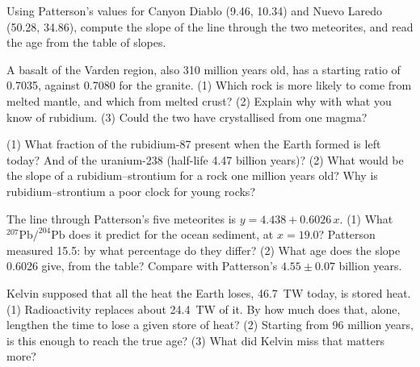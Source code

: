\begin{exercise}[$\star\star$]\label{exo:g12:age-of-the-earth:11}
Using Patterson's values for Canyon Diablo (9.46, 10.34) and Nuevo Laredo
(50.28, 34.86), compute the slope of the line through the two meteorites,
and read the age from the table of slopes.
\end{exercise}

\begin{exercise}[$\star\star\star$]\label{exo:g12:age-of-the-earth:12}
A basalt of the Varden region, also 310 million years old, has a starting
ratio of 0.7035, against 0.7080 for the granite. (1) Which rock is more
likely to come from melted mantle, and which from melted crust? (2) Explain
why with what you know of rubidium. (3) Could the two have crystallised from
one magma?
\end{exercise}

\begin{exercise}[$\star\star\star$]\label{exo:g12:age-of-the-earth:13}
(1) What fraction of the rubidium-87 present when the Earth formed is left
today? And of the uranium-238 (half-life 4.47 billion years)? (2) What would
be the slope of a rubidium--strontium  for a rock one million years
old? Why is rubidium--strontium a poor clock for young rocks?
\end{exercise}

\begin{exercise}[$\star\star\star$]\label{exo:g12:age-of-the-earth:14}
The line through Patterson's five meteorites is $y = 4.438 + 0.6026\,x$.
(1) What $^{207}\mathrm{Pb}/^{204}\mathrm{Pb}$ does it predict for the ocean
sediment, at $x = 19.0$? Patterson measured 15.5: by what percentage do they
differ? (2) What age does the slope 0.6026 give, from the table? Compare with
Patterson's $4.55 \pm 0.07$ billion years.
\end{exercise}

\begin{exercise}[$\star\star\star$]\label{exo:g12:age-of-the-earth:15}
Kelvin supposed that all the heat the Earth loses, \qty{46.7}{TW} today, is
stored heat. (1) Radioactivity replaces about \qty{24.4}{TW} of it. By how
much does that, alone, lengthen the time to lose a given store of heat?
(2) Starting from 96 million years, is this enough to reach the true age?
(3) What did Kelvin miss that matters more?
\end{exercise}

